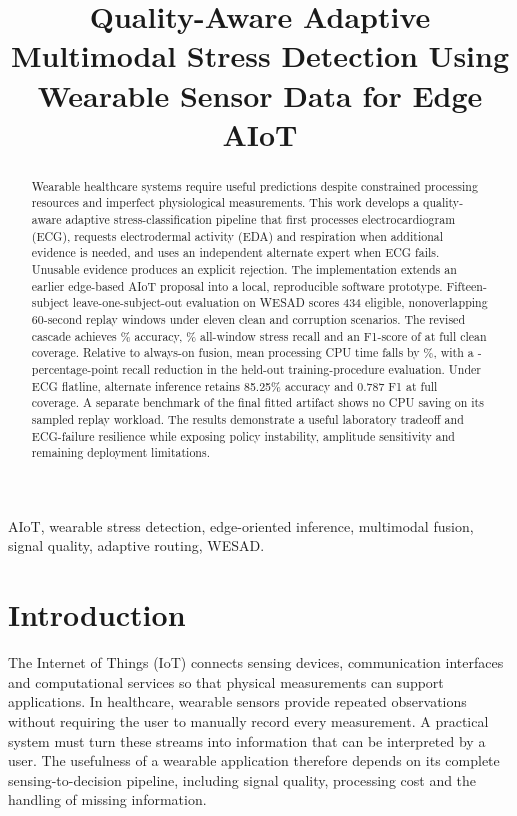 \documentclass[conference,a4paper]{IEEEtran}
\title{Quality-Aware Adaptive Multimodal Stress Detection Using Wearable Sensor Data for Edge AIoT}
\author{
\IEEEauthorblockN{Saanvi Bansal}
\IEEEauthorblockA{Registration No.: 240953564}
\and
\IEEEauthorblockN{Shobit Hegde}
\IEEEauthorblockA{Registration No.: 240953556}
\and
\IEEEauthorblockN{Pranav Gaddam}
\IEEEauthorblockA{Registration No.: 240953548}
}
\newcommand{\pct}{\%}
\begin{document}
\maketitle

\begin{abstract}
Wearable healthcare systems require useful predictions despite constrained processing resources and imperfect physiological measurements. This work develops a quality-aware adaptive stress-classification pipeline that first processes electrocardiogram (ECG), requests electrodermal activity (EDA) and respiration when additional evidence is needed, and uses an independent alternate expert when ECG fails. Unusable evidence produces an explicit rejection. The implementation extends an earlier edge-based AIoT proposal into a local, reproducible software prototype. Fifteen-subject leave-one-subject-out evaluation on WESAD scores 434 eligible, nonoverlapping 60-second replay windows under eleven clean and corruption scenarios. The revised cascade achieves \CascadeAccuracy\pct{} accuracy, \CascadeRecall\pct{} all-window stress recall and an F1-score of \CascadeFone{} at full clean coverage. Relative to always-on fusion, mean processing CPU time falls by \CpuSaving\pct{}, with a \RecallGap{}-percentage-point recall reduction in the held-out training-procedure evaluation. Under ECG flatline, alternate inference retains 85.25\pct{} accuracy and 0.787 F1 at full coverage. A separate benchmark of the final fitted artifact shows no CPU saving on its sampled replay workload. The results demonstrate a useful laboratory tradeoff and ECG-failure resilience while exposing policy instability, amplitude sensitivity and remaining deployment limitations.
\end{abstract}

\begin{IEEEkeywords}
AIoT, wearable stress detection, edge-oriented inference, multimodal fusion, signal quality, adaptive routing, WESAD.
\end{IEEEkeywords}

\section{Introduction}
The Internet of Things (IoT) connects sensing devices, communication interfaces and computational services so that physical measurements can support applications. In healthcare, wearable sensors provide repeated observations without requiring the user to manually record every measurement. A practical system must turn these streams into information that can be interpreted by a user. The usefulness of a wearable application therefore depends on its complete sensing-to-decision pipeline, including signal quality, processing cost and the handling of missing information.
\end{document}
